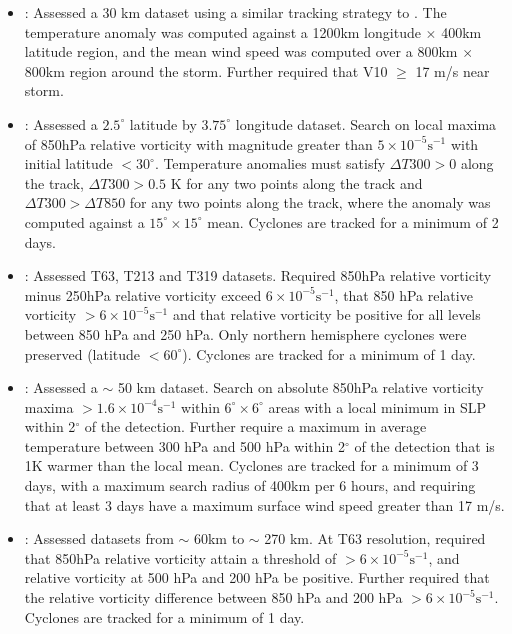 \documentclass[gmdd, hvmath, online]{copernicus_discussions}
\begin{document}
\begin{itemize}
\item \cite{walsh2004fine}:  Assessed a 30 km dataset using a similar tracking strategy to \cite{nguyen2001interannual}.  The temperature anomaly was computed against a 1200km longitude $\times$ 400km latitude region, and the mean wind speed was computed over a 800km $\times$ 800km region around the storm.  Further required that V10 $\geq$ 17 m/s near storm.

\item \cite{mcdonald2005tropical}:  Assessed a $2.5^\circ$ latitude by $3.75^\circ$ longitude dataset.  Search on local maxima of 850hPa relative vorticity with magnitude greater than $5 \times 10^{-5} \mbox{s}^{-1}$ with initial latitude $< 30^\circ$.  Temperature anomalies must satisfy $\Delta T300 > 0$ along the track, $\Delta T300 > 0.5$ K for any two points along the track and $\Delta T300 > \Delta T850$ for any two points along the track, where the anomaly was computed against a $15^\circ \times 15^\circ$ mean.  Cyclones are tracked for a minimum of 2 days.

\item \cite{bengtsson2007how}:  Assessed T63, T213 and T319 datasets.  Required 850hPa relative vorticity minus 250hPa relative vorticity exceed $6 \times 10^{-5} \mbox{s}^{-1}$, that 850 hPa relative vorticity $> 6 \times 10^{-5} \mbox{s}^{-1}$ and that relative vorticity be positive for all levels between 850 hPa and 250 hPa.  Only northern hemisphere cyclones were preserved (latitude $< 60^\circ$).  Cyclones are tracked for a minimum of 1 day.

\item \cite{knutson2007simulation, zhao2009simulations}:  Assessed a $\sim$ 50 km dataset.  Search on absolute 850hPa relative vorticity maxima $> 1.6 \times 10^{-4} \mbox{s}^{-1}$ within $6^\circ \times 6^\circ$ areas with a local minimum in SLP within 2$^\circ$ of the detection.  Further require a maximum in average temperature between 300 hPa and 500 hPa within 2$^\circ$ of the detection that is 1K warmer than the local mean.  Cyclones are tracked for a minimum of 3 days, with a maximum search radius of 400km per 6 hours, and requiring that at least 3 days have a maximum surface wind speed greater than 17 m/s.

\item \cite{strachan2013investigating}:  Assessed datasets from $\sim$ 60km to $\sim$ 270 km.  At T63 resolution, required that 850hPa relative vorticity attain a threshold of $> 6 \times 10^{-5} \mbox{s}^{-1}$, and relative vorticity at 500 hPa and 200 hPa be positive.  Further required that the relative vorticity difference between 850 hPa and 200 hPa $> 6 \times 10^{-5} \mbox{s}^{-1}$.  Cyclones are tracked for a minimum of 1 day.


\end{itemize}
\end{document}
